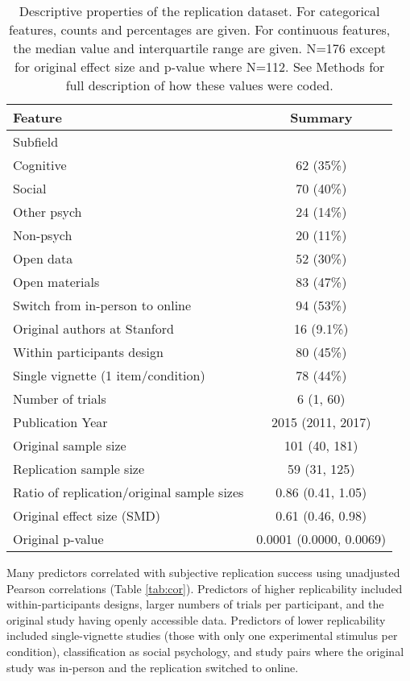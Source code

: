 \documentclass[
  english,
  a4paper,
]{article}
\begin{document}
\begin{table}[!h]

\caption{\label{tab:dist}Descriptive properties of the replication dataset. For categorical features, counts and percentages are given. For continuous features, the median value and interquartile range are given. N=176 except for original effect size and p-value where N=112. See Methods for full description of how these values were coded. }
\centering
\fontsize{10}{12}\selectfont
\begin{tabular}[t]{lc}
\toprule
Feature & Summary\\
\midrule
Subfield & \\
\hspace{1em}Cognitive & 62 (35\%)\\
\hspace{1em}Social & 70 (40\%)\\
\hspace{1em}Other psych & 24 (14\%)\\
\hspace{1em}Non-psych & 20 (11\%)\\
Open data & 52 (30\%)\\
Open materials & 83 (47\%)\\
Switch from in-person to online & 94 (53\%)\\
Original authors at Stanford & 16 (9.1\%)\\
Within participants design & 80 (45\%)\\
Single vignette (1 item/condition) & 78 (44\%)\\
Number of trials & 6 (1, 60)\\
Publication Year & 2015 (2011, 2017)\\
Original sample size & 101 (40, 181)\\
Replication sample size & 59 (31, 125)\\
Ratio of replication/original sample sizes & 0.86 (0.41, 1.05)\\
Original effect size (SMD) & 0.61 (0.46, 0.98)\\
Original p-value & 0.0001 (0.0000, 0.0069)\\
\bottomrule
\end{tabular}
\end{table}

Many predictors correlated with subjective replication success using unadjusted Pearson correlations (Table \ref{tab:cor}). Predictors of higher replicability included within-participants designs, larger numbers of trials per participant, and the original study having openly accessible data. Predictors of lower replicability included single-vignette studies (those with only one experimental stimulus per condition), classification as social psychology, and study pairs where the original study was in-person and the replication switched to online.
\end{document}
